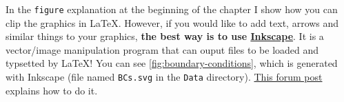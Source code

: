 In the \verb|figure| explanation at the beginning of the chapter I show how you can clip the graphics in \LaTeX. However, if you would like to add text, arrows and similar things to your graphics, \textbf{the best way is to use \href{https://inkscape.org/}{Inkscape}}. It is a vector/image manipulation program that can ouput files to be loaded and typsetted by \LaTeX! You can see \cref{fig:boundary-conditions}, which is generated with Inkscape (file named \texttt{BCs.svg} in the \texttt{Data} directory). \href{https://tex.stackexchange.com/questions/151232/exporting-from-inkscape-to-latex-via-tikz}{This forum post} explains how to do it.

